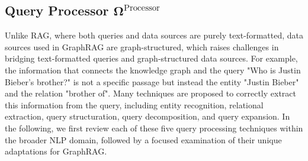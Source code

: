 \begin{table}[t!]
\caption{Difference of query processor $\boldsymbol{\Omega}^{\text{Processor}}$ between RAG and GraphRAG.}
\label{tab-query-process}
\end{table}

\newpage
\subsection{Query Processor \texorpdfstring{$\boldsymbol{\Omega}^{\text{Processor}}$}{Omega Processor}}

Unlike RAG, where both queries and data sources are purely text-formatted, data sources used in GraphRAG are graph-structured, which raises challenges in bridging text-formatted queries and graph-structured data sources. For example, the information that connects the knowledge graph and the query "Who is Justin Bieber's brother?" is not a specific passage but instead the entity "Justin Bieber" and the relation "brother of". Many techniques are proposed to correctly extract this information from the query, including entity recognition, relational extraction, query structuration, query decomposition, and query expansion. In the following, we first review each of these five query processing techniques within the broader NLP domain, followed by a focused examination of their unique adaptations for GraphRAG.


